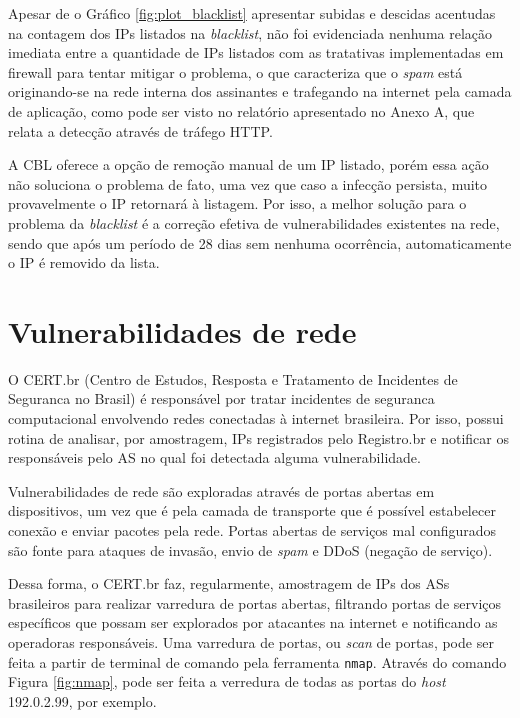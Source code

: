     Apesar de o Gráfico \ref{fig:plot_blacklist} apresentar subidas e descidas acentudas na contagem dos IPs listados na \textit{blacklist}, não foi evidenciada nenhuma relação imediata entre a quantidade de IPs listados com as tratativas implementadas em firewall para tentar mitigar o problema, o que caracteriza que o \textit{spam} está originando-se na rede interna dos assinantes e trafegando na internet pela camada de aplicação, como pode ser visto no relatório apresentado no Anexo A, que relata a detecção através de tráfego HTTP. 
    
    A CBL oferece a opção de remoção manual de um IP listado, porém essa ação não soluciona o problema de fato, uma vez que caso a infecção persista, muito provavelmente o IP retornará à listagem. Por isso, a melhor solução para o problema da \textit{blacklist} é a correção efetiva de vulnerabilidades existentes na rede, sendo que após um período de 28 dias sem nenhuma ocorrência, automaticamente o IP é removido da lista.

\section{Vulnerabilidades de rede}

    O CERT.br (Centro de Estudos, Resposta e Tratamento de Incidentes de Seguranca no Brasil) é responsável por tratar incidentes de seguranca computacional envolvendo redes conectadas à internet brasileira. Por isso, possui rotina de analisar, por amostragem, IPs registrados pelo Registro.br e notificar os responsáveis pelo AS no qual foi detectada alguma vulnerabilidade.
    
    Vulnerabilidades de rede são exploradas através de portas abertas em dispositivos, um vez que é pela camada de transporte que é possível estabelecer conexão e enviar pacotes pela rede. Portas abertas de serviços mal configurados são fonte para ataques de invasão, envio de \textit{spam} e DDoS (negação de serviço).
    
    Dessa forma, o CERT.br faz, regularmente, amostragem de IPs dos ASs brasileiros para realizar varredura de portas abertas, filtrando portas de serviços específicos que possam ser explorados por atacantes na internet e notificando as operadoras responsáveis. Uma varredura de portas, ou \textit{scan} de portas, pode ser feita a partir de terminal de comando pela ferramenta {\tt nmap}. Através do comando Figura \ref{fig:nmap}, pode ser feita a verredura de todas as portas do \textit{host} 192.0.2.99, por exemplo.

